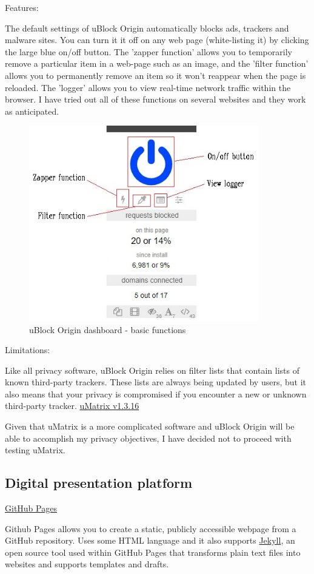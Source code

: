 \documentclass{article}
\begin{document}
\noindent Features:

The default settings of uBlock Origin automatically blocks ads, trackers and malware sites. You can turn it it off on any web page (white-listing it) by clicking the large blue on/off button. The 'zapper function' allows you to temporarily remove a particular item in a web-page such as an image, and the 'filter function' allows you to permanently remove an item so it won't reappear when the page is reloaded. The 'logger' allows you to view real-time network traffic within the browser. I have tried out all of these functions on several websites and they work as anticipated. \newline
\newline
\begin{figure}[htp]
    \centering
    \includegraphics[width=10cm]{Functions labeled.jpg}
    \caption{uBlock Origin dashboard - basic functions}
    \label{fig:uBlock Origin dashboard}
\end{figure}

\noindent Limitations:

Like all privacy software, uBlock Origin relies on filter lists that contain lists of known third-party trackers. These lists are always being updated by users, but it also means that your privacy is compromised if you encounter a new or unknown third-party tracker.\newline
\newline
\noindent\href{https://github.com/gorhill/uMatrix}{uMatrix v1.3.16}

Given that uMatrix is a more complicated software and uBlock Origin will be able to accomplish my privacy objectives, I have decided not to proceed with testing uMatrix.\newline

\subsection{Digital presentation platform}
\href{https://pages.github.com/}{GitHub Pages}

Github Pages allows you to create a static, publicly accessible webpage from a GitHub repository. Uses some HTML language and it also supports \href{https://github.com/jekyll/jekyll}{Jekyll}, an open source tool used within GitHub Pages that transforms plain text files into websites and supports templates and drafts. 
\end{document}
